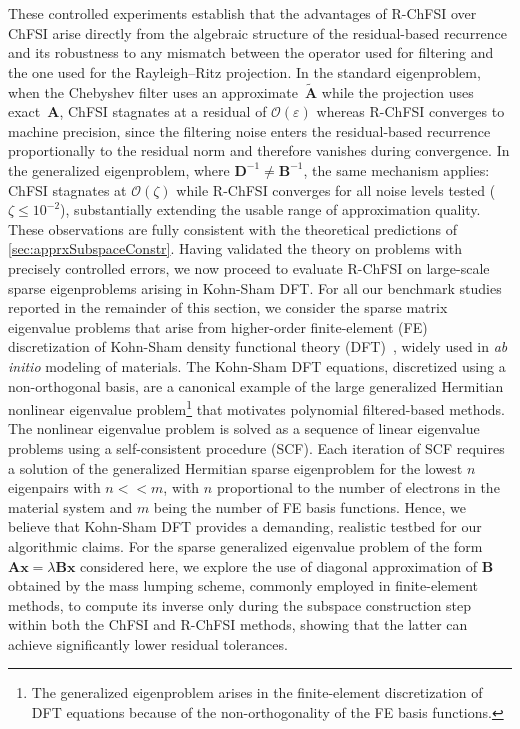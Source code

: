 \documentclass[preprint,3p,number,sort&compress]{elsarticle}
\newcommand{\bx}{\textbf{x}}
\newcommand{\bA}{\textbf{A}}
\newcommand{\bB}{\textbf{B}}
\newcommand{\bD}{\textbf{D}}
\newcommand{\cn}{\color{black}}
\begin{document}
{These controlled experiments establish that the advantages of R-ChFSI over ChFSI arise directly from the algebraic structure of the residual-based recurrence and its robustness to any mismatch between the operator used for filtering and the one used for the Rayleigh--Ritz projection. In the standard eigenproblem, when the Chebyshev filter uses an approximate~$\tilde{\bA}$ while the projection uses exact~$\bA$, ChFSI stagnates at a residual of $\mathcal{O}(\varepsilon)$ whereas R-ChFSI converges to machine precision, since the filtering noise enters the residual-based recurrence proportionally to the residual norm and therefore vanishes during convergence. In the generalized eigenproblem, where $\bD^{-1}\neq\bB^{-1}$, the same mechanism applies: ChFSI stagnates at $\mathcal{O}(\zeta)$ while R-ChFSI converges for all noise levels tested ($\zeta\leq 10^{-2}$), substantially extending the usable range of approximation quality. These observations are fully consistent with the theoretical predictions of \cref{sec:apprxSubspaceConstr}. Having validated the theory on problems with precisely controlled errors, we now proceed to evaluate R-ChFSI on large-scale sparse eigenproblems arising in Kohn-Sham DFT.
\cn}
For all our benchmark studies reported in the remainder of this section, we consider the sparse matrix eigenvalue problems that arise from higher-order finite-element (FE) discretization of Kohn-Sham density functional theory (DFT)~\cite{chenAdaptiveFiniteElement2014,schauerAllelectronKohnSham2013,tsuchidaAdaptiveFiniteelementMethod1996,tsuchidaElectronicstructureCalculationsBased1995,dasDFTFE10Massively2022,motamarriDFTFEMassivelyParallel2020,paskFiniteElementMethods2005,motamarriHigherorderAdaptiveFiniteelement2013}, widely used in \emph{ab initio} modeling of materials. The Kohn-Sham DFT equations, discretized using a non-orthogonal basis, are a canonical example of the large generalized Hermitian nonlinear eigenvalue problem\footnote{The generalized eigenproblem arises in the finite-element discretization of DFT equations because of the non-orthogonality of the FE basis functions.} that motivates polynomial filtered-based methods. The nonlinear eigenvalue problem is solved as a sequence of linear eigenvalue problems using a self-consistent procedure (SCF). Each iteration of SCF requires a solution of the generalized Hermitian sparse eigenproblem for the lowest $n$ eigenpairs with $n<<m$, with $n$ proportional to the number of electrons in the material system and $m$ being the number of FE basis functions. Hence, we believe that Kohn-Sham DFT provides a demanding, realistic testbed for our algorithmic claims. For the sparse generalized eigenvalue problem of the form $\bA \bx = \lambda \bB \bx$ considered here, we explore the use of diagonal approximation of $\bB$ obtained by the mass lumping scheme, commonly employed in finite-element methods, to compute its inverse only during the subspace construction step within both the ChFSI and R-ChFSI methods, showing that the latter can achieve significantly lower residual tolerances. 
\end{document}
